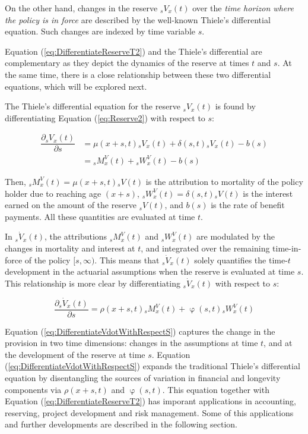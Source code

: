 \documentclass[12pt]{article}
\begin{document}
On the other hand, changes in the reserve ${}_sV_x(t)$ over the \textit{time horizon where the policy is in force} are described by the well-known Thiele's differential equation. Such changes are indexed by time variable $s$.
 
Equation (\ref{eq:DifferentiateReserveT2}) and the Thiele's differential are complementary as they depict the dynamics of the reserve at times $t$ and $s$. At the same time, there is a close relationship between these two differential equations, which will be explored next.

The Thiele's differential equation for the reserve ${}_sV_x(t)$ is found by differentiating Equation (\ref{eq:Reserve2}) with respect to $s$:

\begin{equation}\label{eq:Thiele}
	\begin{split}
		\dfrac{\partial {}_sV_x(t)}{\partial s}&= \mu(x+s,t){}_sV_x(t) + \delta(s,t){}_sV_x(t) - b(s) \\
		&= {}_sM^V_x(t) + {}_sW^V_x(t) - b(s)
	\end{split}
\end{equation}

 
Then, ${}_sM^V_x(t)=\mu(x+s,t){}_sV(t)$ is the attribution to mortality of the policy holder due to reaching age $(x+s)$,  ${}_sW^V_x(t)=\delta(s,t){}_sV(t)$ is the interest earned on the amount of the reserve ${}_sV(t)$, and $b(s)$ is the rate of benefit payments. All these quantities are evaluated at time $t$.
  
 In ${}_s\dot{V}_x(t)$, the attributions ${}_sM^V_x(t)$ and ${}_sW^V_x(t)$ are modulated by the changes in mortality and interest at $t$, and integrated over the remaining time-in-force of the policy $[s, \infty)$. This means that ${}_s\dot{V}_x(t)$ solely quantifies the time-$t$ development in the actuarial assumptions when the reserve is evaluated at time $s$. This relationship is more clear by differentiating ${}_s\dot{V}_x(t)$ with respect to $s$: 

\begin{equation}\label{eq:DifferentiateVdotWithRespectS}
\dfrac{\partial	{}_s\dot{V}_x(t)}{\partial s}= \rho(x+s,t) {}_sM^V_x(t)+ \upvarphi(s,t) {}_sW^V_x(t)
\end{equation}

Equation (\ref{eq:DifferentiateVdotWithRespectS}) captures the change in the provision in two time dimensions: changes in the assumptions at time $t$, and at the development of the reserve at time $s$. Equation (\ref{eq:DifferentiateVdotWithRespectS}) expands the traditional Thiele's differential equation by disentangling the sources of variation in financial and longevity components via $\rho(x+s,t)$ and $\upvarphi(s,t)$. This equation together with Equation (\ref{eq:DifferentiateReserveT2}) has imporant applications in accounting, reserving, project development and risk management. Some of this applications and further developments are described in the following section.  
\end{document}
